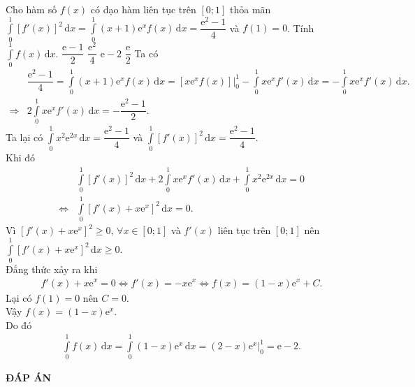 \begin{ex}%
 Cho hàm số $f(x)$ có đạo hàm liên tục trên $[0;1]$ thỏa mãn $\displaystyle\int\limits_0^1 \left[ f'(x) \right]^2 \mathrm{\,d}x = \displaystyle\int\limits_0^1 (x+1)\mathrm{e}^x f(x) \mathrm{\,d}x = \dfrac{\mathrm{e}^2 - 1}{4}$ và $f(1) = 0$. Tính $\displaystyle\int\limits_0^1 f(x) \mathrm{\,d}x$.
 \choice
  {$\dfrac{\mathrm{e} - 1}{2}$}
  {$\dfrac{\mathrm{e}^2}{4}$}
  {\True $\mathrm{e} - 2$}
  {$\dfrac{\mathrm{e}}{2}$}
 \loigiai
  {
  Ta có
  \begin{align*}
   & \dfrac{\mathrm{e}^2 - 1}{4} = \displaystyle\int\limits_0^1 (x+1)\mathrm{e}^x f(x) \mathrm{\,d}x = \left[ x \mathrm{e}^x f(x) \right]\Big|_0^1 - \displaystyle\int\limits_0^1 x \mathrm{e}^x f'(x) \mathrm{\,d}x = -\displaystyle\int\limits_0^1 x \mathrm{e}^x f'(x) \mathrm{\,d}x.\\
   \Rightarrow & 2\displaystyle\int\limits_0^1 x \mathrm{e}^x f'(x) \mathrm{\,d}x = -\dfrac{\mathrm{e^2 - 1}}{2}.
  \end{align*}
  Ta lại có $\displaystyle\int\limits_0^1 x^2 \mathrm{e}^{2x} \mathrm{\,d}x = \dfrac{\mathrm{e}^2 - 1}{4}$ và $\displaystyle\int\limits_0^1 \left[ f'(x) \right]^2 \mathrm{\,d}x = \dfrac{\mathrm{e^2} - 1}{4}$.\\
  Khi đó
  \begin{align*}
   & \displaystyle\int\limits_0^1 \left[ f'(x) \right]^2 \mathrm{\,d}x + 2\displaystyle\int\limits_0^1 x \mathrm{e}^x f'(x) \mathrm{\,d}x + \displaystyle\int\limits_0^1 x^2 \mathrm{e}^{2x} \mathrm{\,d}x = 0 \\
   \Leftrightarrow & \displaystyle\int\limits_0^1 \left[ f'(x) + x \mathrm{e}^x \right]^2 \mathrm{\,d}x = 0.
  \end{align*}
  Vì $\left[ f'(x) + x \mathrm{e}^x \right]^2 \geq 0, \, \forall x \in [0;1]$ và $f'(x)$ liên tục trên $[0;1]$ nên $\displaystyle\int\limits_0^1 \left[ f'(x) + x \mathrm{e}^x \right]^2 \mathrm{\,d}x \geq 0$.\\
  Đẳng thức xảy ra khi
  \begin{align*}
   f'(x) + x \mathrm{e}^x = 0 \Leftrightarrow f'(x) = -x \mathrm{e}^x \Leftrightarrow f(x) = (1 - x) \mathrm{e}^x + C.
  \end{align*}
  Lại có $f(1) = 0$ nên $C = 0$.\\
  Vậy $f(x) = (1 - x) \mathrm{e}^x$.\\
  Do đó 
  \begin{align*}
   \displaystyle\int\limits_0^1 f(x) \mathrm{\,d}x = \displaystyle\int\limits_0^1 (1 - x) \mathrm{e}^x \mathrm{\,d}x = (2 - x) \mathrm{e}^x \big|_0^1 = \mathrm{e} - 2.
  \end{align*}
  }
\end{ex}

\newpage
\begin{center}
	\textbf{ĐÁP ÁN}
\end{center}
\begin{multicols}{10}
	 
\end{multicols}